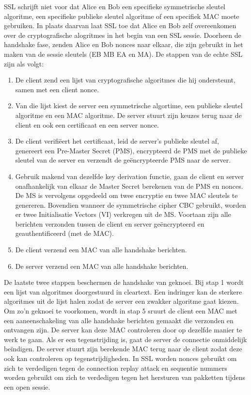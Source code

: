 SSL schrijft niet voor dat Alice en Bob een specifieke symmetrische sleutel algoritme, een specifieke publieke sleutel algoritme of een specifiek MAC moete gebruiken. In plaats daarvan laat SSL toe dat Alice en Bob zelf overeenkomen over de cryptografische alogritmes in het begin van een SSL sessie. Doorheen de handshake fase, zenden Alice en Bob nonces naar elkaar, die zijn gebruikt in het maken van de sessie sleutels (EB MB EA en MA). De stappen van de echte SSL zijn als volgt:
\begin{enumerate}

\item De client zend een lijst van cryptografische algoritmes die hij ondersteunt, samen met een client nonce.
\item Van die lijst kiest de server een symmetrische algortime, een publieke sleutel algoritme en een MAC algoritme. De server stuurt zijn keuzes terug naar de client en ook een certificaat en een server nonce.
\item De client verifiëert het certificaat, leid de server’s publieke sleutel af, genereert een Pre-Master Secret (PMS), encrypteerd de PMS met de publieke sleutel van de server en verzendt de geëncrypteerde PMS naar de server.
\item Gebruik makend van dezelfde key derivation functie, gaan de client en server onafhankelijk van elkaar de Master Secret berekenen van de PMS en nonces. De MS is vervolgens opgedeeld om twee encryptie en twee MAC sleutels te genereren. Bovendien wanneer de symmetrische cipher CBC gebruikt, worden er twee Initialisatie Vectors (VI) verkregen uit de MS. Voortaan zijn alle berichten verzonden tussen de client en server geëncrypteerd en geauthentificeerd (met de MAC).
\item De client verzend een MAC van alle handshake berichten.
\item De server verzend een MAC van alle handshake berichten.
\end{enumerate}
De laatste twee stappen beschermen de handshake van geknoei.
Bij stap 1 wordt een lijst van algoritmes doorgestuurd in cleartext. Een indringer kan de sterkere algoritmes uit de lijst halen zodat de server een zwakker algoritme gaat kiezen. Om zo’n geknoei te voorkomen, wordt in stap 5 sruurt de client een MAC met een aaneenschakeling van alle handshake berichten gemaakt die verzonden en ontvangen zijn. De server kan deze MAC controleren door op dezelfde manier te werk te gaan. Als er een tegenstrijding is, gaat de server de connectie onmiddelijk beïndigen. De server stuurt zijn berekende MAC terug naar de client zodat deze ook kan controleren op tegenstrijdigheden.
In SSL worden nonces gebruikt om zich te verdedigen tegen de connection replay attack en sequentie nummers worden gebruikt om zich te verdedigen tegen het hersturen van pakketten tijdens een open sessie.

